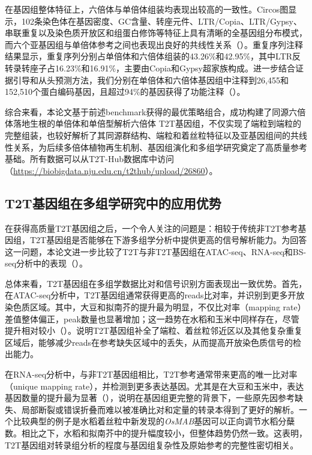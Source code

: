 在基因组整体特征上，六倍体与单倍体组装均表现出较高的一致性。Circos图显示，102条染色体在基因密度、GC含量、转座元件、LTR/Copia、LTR/Gypsy、串联重复以及染色质开放区和组蛋白修饰等特征上具有清晰的全基因组分布模式，而六个亚基因组与单倍体参考之间也表现出良好的共线性关系（）。重复序列注释结果显示，重复序列分别占单倍体和六倍体组装的43.26\%和42.95\%，其中LTR反转录转座子占16.23\%和16.91\%，主要由Copia和Gypsy超家族构成。进一步结合证据引导和从头预测方法，我们分别在单倍体和六倍体基因组中注释到26,455和152,510个蛋白编码基因，且超过94\%的基因获得了功能注释（）。

综合来看，本论文基于前述benchmark获得的最优策略组合，成功构建了同源六倍体落地生根的单倍体和单倍型解析六倍体 T2T基因组，不仅实现了端粒到端粒的完整组装，也较好解析了其同源群结构、端粒和着丝粒特征以及亚基因组间的共线性关系，为后续多倍体植物再生机制、基因组演化和多组学研究奠定了高质量参考基础。所有数据可以从T2T-Hub数据库中访问（\url{https://biobigdata.nju.edu.cn/t2thub/upload/26860}）。

\subsection{T2T基因组在多组学研究中的应用优势}

在获得高质量T2T基因组之后，一个令人关注的问题是：相较于传统非T2T参考基因组，T2T基因组是否能够在下游多组学分析中提供更高的信号解析能力。为回答这一问题，本论文进一步比较了T2T与非T2T基因组在ATAC-seq、RNA-seq和BS-seq分析中的表现（）。

总体来看，T2T基因组在多组学数据比对和信号识别方面表现出一致优势。首先，在ATAC-seq分析中，T2T基因组通常获得更高的reads比对率，并识别到更多开放染色质区域。其中，大豆和拟南芥的提升最为明显，不仅比对率（mapping rate）差值整体偏正，peak数量也显著增加；这一趋势在水稻和玉米中同样存在，尽管提升相对较小（）。说明T2T基因组补全了端粒、着丝粒邻近区以及其他复杂重复区域后，能够减少reads在参考缺失区域中的丢失，从而提高开放染色质信号的检出能力。

在RNA-seq分析中，与非T2T基因组相比，T2T参考通常带来更高的唯一比对率（unique mapping rate），并检测到更多表达基因。尤其是在大豆和玉米中，表达基因数量的提升最为显著（），说明在基因组更完整的背景下，一些原先因参考缺失、局部断裂或错误折叠而难以被准确比对和定量的转录本得到了更好的解析。一个比较典型的例子是水稻着丝粒中新发现的\textit{OsMAB}基因可以正向调节水稻分蘖数\cite{lv2024centromere}。相比之下，水稻和拟南芥中的提升幅度较小，但整体趋势仍然一致。这表明，T2T基因组对转录组分析的程度与基因组复杂性及原始参考的完整性密切相关。

